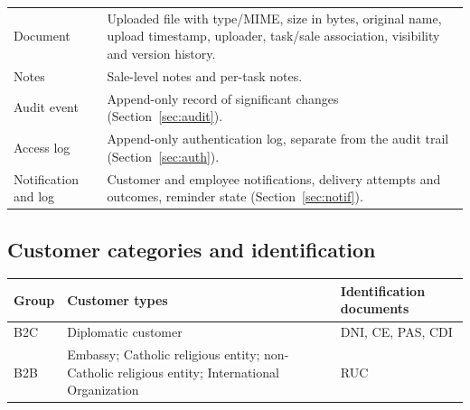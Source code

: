 \documentclass[11pt,a4paper]{article}
\begin{document}
\begin{longtable}{@{}L{3.2cm}L{12.6cm}@{}}
	Document             & Uploaded file with type/MIME, size in bytes, original name, upload
	timestamp, uploader, task/sale association, visibility and version history.                                                                                                                                                                                                         \\
	Notes                & Sale-level notes and per-task notes.                                                                                                                                                                                                                         \\
	Audit event          & Append-only record of significant changes (Section~\ref{sec:audit}).                                                                                                                                                                                         \\
	Access log           & Append-only authentication log, separate from the audit trail
	(Section~\ref{sec:auth}).                                                                                                                                                                                                                                                           \\
	Notification and log & Customer and employee notifications, delivery attempts and outcomes, reminder state (Section~\ref{sec:notif}).                                                                                                                                               \\
	\bottomrule
\end{longtable}

\subsection{Customer categories and identification}

\begin{longtable}{@{}L{2.4cm}L{7.0cm}L{6.4cm}@{}}
	\toprule
	\textbf{Group} & \textbf{Customer types}                                                                       & \textbf{Identification documents} \\
	\midrule
	\endhead
	B2C            & Diplomatic customer                                                                           & DNI, CE, PAS, CDI                 \\
	B2B            & Embassy; Catholic religious entity; non-Catholic religious entity; International Organization & RUC                               \\
	\bottomrule
\end{longtable}
\end{document}
